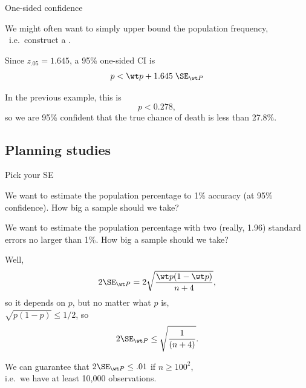 \begin{frame}{One-sided confidence}

    We might often want to simply \alert{upper bound} the population frequency,\\\
    i.e.\ construct a .

    \vspace{2em}

    Since $z_{.05} = 1.645$, 
    a \alert{95\% one-sided CI} is 
        \[ p < \wt p + 1.645 \; \SE_{\wt P} \]

    \vspace{2em}

    In the previous example, this is
        \[ p < 0.278 , \]
    so we are 95\% confident that the true chance of death is less than 27.8\%.


\end{frame}

\subsection{Planning studies}

\begin{frame}{Pick your SE}

    We want to estimate the population percentage to \alert{1\% accuracy}
    (at 95\% confidence).
    How big a sample should we take?

    \vspace{2em}
    \pause

     We want to estimate the population percentage
    with two {\tiny (really, 1.96)} standard errors no larger than 1\%.
    How big a sample should we take?

    \vspace{2em}

    Well,
        \[ 2 \SE_{\wt P} = 2 \sqrt{\frac{\wt p (1-\wt p)}{n+4} } ,\]
        so it \alert<1>{depends on $p$}, \pause but \alert<2>{no matter what $p$ is,}\\
    $\sqrt{p (1-p)} \le 1/2$,
    so
    \[ 2 \SE_{\wt P} \le \sqrt{\frac{1}{(n+4)} } .\]

    \vspace{1em}

    We can guarantee that $2 \SE_{\wt P} \le .01$ if $n \ge 100^2$, \\
    i.e.\ we have at least 10,000 observations.


\end{frame}

